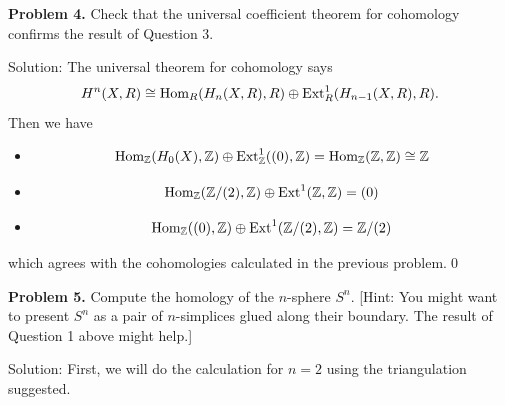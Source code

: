 \begin{dang}
\textbf{Problem 4.} Check that the universal coefficient theorem for cohomology confirms the result of Question 3.
\end{dang}
Solution: The universal theorem for cohomology says 
\begin{equation}
    H^n(X,R)\cong\text{Hom}_R(H_n(X,R),R)\oplus\text{Ext}_R^1(H_{n-1}(X,R),R).
\end{equation}
Then we have 
\begin{itemize}
    \item[Degree 0:]
    \begin{equation}
            \text{Hom}_{\mathbb{Z}}(H_0(X),\mathbb{Z})\oplus\text{Ext}_{\mathbb{Z}}^1((0),\mathbb{Z})=\text{Hom}_{\mathbb{Z}}(\mathbb{Z},\mathbb{Z})\cong\mathbb{Z}
    \end{equation}
    \item[Degree 1:]
    \begin{equation}
        \text{Hom}_{\mathbb{Z}}(\mathbb{Z}/(2),\mathbb{Z})\oplus\text{Ext}^1(\mathbb{Z},\mathbb{Z})=(0)
    \end{equation}
    \item[Degree 2:]
    \begin{equation}
        \text{Hom}_{\mathbb{Z}}((0),\mathbb{Z})\oplus\text{Ext}^1(\mathbb{Z}/(2),\mathbb{Z})=\mathbb{Z}/(2)
    \end{equation}
\end{itemize}
which agrees with the cohomologies calculated in the previous problem.\qed 
\begin{dang}
\textbf{Problem 5.} Compute the homology of the \(n\)-sphere \(S^n\). [Hint: You might want to present \(S^n\) as a pair of \(n\)-simplices glued along their boundary. The result of Question 1 above might help.]
\end{dang}
Solution: 
First, we will do the calculation for $n=2$ using the triangulation suggested.
